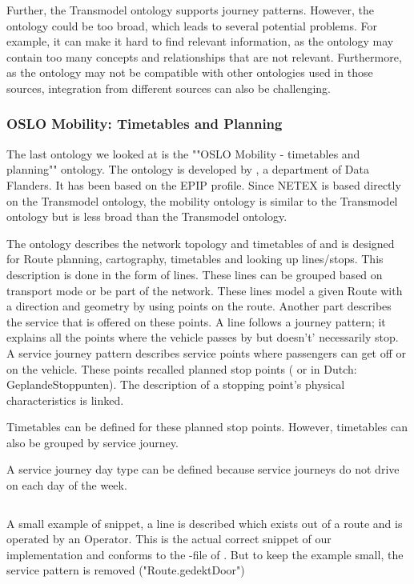 Further, the Transmodel ontology supports journey patterns. However, the ontology could be too broad, which leads to several potential problems. For example, it can make it hard to find relevant information, as the ontology may contain too many concepts and relationships that are not relevant. Furthermore, as the ontology may not be compatible with other ontologies used in those sources, integration from different sources can also be challenging.

\subsubsection{OSLO Mobility: Timetables and Planning}
The last ontology we looked at is the ""OSLO Mobility - timetables and planning"" \cite{noauthor_oslo_2023} ontology. The ontology is developed by , a department of Data Flanders. It has been based on the EPIP profile. Since NETEX is based directly on the Transmodel ontology, the  mobility ontology is similar to the Transmodel ontology but is less broad than the Transmodel ontology.

The ontology describes the network topology and timetables of  and is designed for Route planning, cartography, timetables and looking up lines/stops. This description is done in the form of lines. These lines can be grouped based on transport mode or be part of the network. These lines model a given Route with a direction and geometry by using points on the route. Another part describes the service that is offered on these points. A line follows a journey pattern; it explains all the points where the vehicle passes by but doesn't' necessarily stop. A service journey pattern describes service points where passengers can get off or on the vehicle. These points recalled planned stop points ( or in Dutch: GeplandeStoppunten). The description of a stopping point's physical characteristics is linked. 

Timetables can be defined for these planned stop points. However, timetables can also be grouped by service journey.

A service journey day type can be defined because service journeys do not drive on each day of the week. 

\begin{listing}[H]
\inputminted[linenos,frame=single,breaklines]{jsonld}{code/oslo_example_line.jsonld}
\caption{A small example of  snippet, a line is described which exists out of a route and is operated by an Operator. This is the actual correct snippet of our implementation and conforms to the -file of . But to keep the example small, the service pattern is removed ("Route.gedektDoor")}
\label{code:example:line}
\end{listing}


